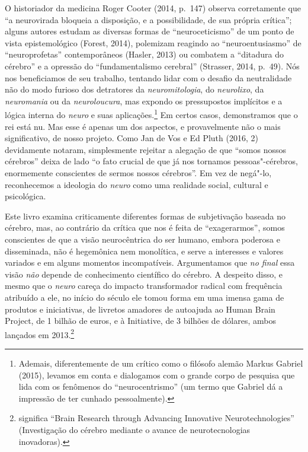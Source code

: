 O historiador da medicina Roger Cooter (2014, p.~147) observa
corretamente que ``a neurovirada bloqueia a disposição, e a
possibilidade, de sua própria crítica''; alguns autores estudam as
diversas formas de ``neuroceticismo'' de um ponto de vista
epistemológico (Forest, 2014), polemizam reagindo ao ``neuroentusiasmo''
de ``neuroprofetas'' contemporâneos (Hasler, 2013) ou combatem a
``ditadura do cérebro'' e a opressão do ``fundamentalismo cerebral''
(Strasser, 2014, p.~49). Nós nos beneficiamos de seu trabalho, tentando
lidar com o desafio da neutralidade não do modo furioso dos detratores
da \emph{neuromitologia}, do \emph{neurolixo}, da \emph{neuromania} ou
da \emph{neuroloucura}, mas expondo os pressupostos implícitos e a
lógica interna do \emph{neuro} e suas aplicações.\footnote[2]{Ademais, diferentemente de um crítico como o filósofo alemão Markus
Gabriel (2015), levamos em conta e dialogamos com o grande corpo de
pesquisa que lida com os fenômenos do ``neurocentrismo'' (um termo que
Gabriel dá a impressão de ter cunhado pessoalmente).} Em
certos casos, demonstramos que o rei está nu. Mas esse é apenas um dos
aspectos, e provavelmente não o mais significativo, de nosso projeto.
Como Jan de Vos e Ed Pluth (2016, 2) devidamente notaram, simplesmente
rejeitar a alegação de que ``somos nossos cérebros'' deixa de lado ``o
fato crucial de que já nos tornamos pessoas"-cérebros, enormemente
conscientes de sermos nossos cérebros''. Em vez de negá"-lo, reconhecemos
a ideologia do \emph{neuro} como uma realidade social, cultural e
psicológica.

Este livro examina criticamente diferentes formas de subjetivação
baseada no cérebro, mas, ao contrário da crítica que nos é feita de
``exagerarmos'', somos conscientes de que a visão neurocêntrica do
ser humano, embora poderosa e disseminada, não é hegemônica nem
monolítica, e serve a interesses e valores variados e em alguns momentos
incompatíveis. Argumentamos que \emph{no final} essa visão \emph{não}
depende de conhecimento científico do cérebro. A despeito disso, e mesmo
que o \emph{neuro} careça do impacto transformador radical com
frequência atribuído a ele, no início do século  ele tomou forma em
uma imensa gama de produtos e iniciativas, de livretos amadores de
autoajuda ao Human Brain Project, de 1 bilhão de euros, e à 
Initiative, de 3 bilhões de dólares, ambos lançados em
2013.\footnote[3]{ significa ``Brain Research through Advancing Innovative
Neurotechnologies'' (Investigação do cérebro mediante o avance de
neurotecnologias inovadoras).}

